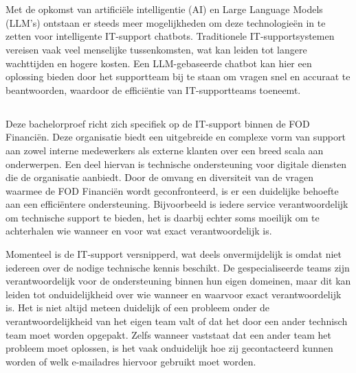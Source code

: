 
\chapter{}%
\label{ch:inleiding}

Met de opkomst van artificiële intelligentie (AI) en Large Language Models (LLM’s) ontstaan er steeds meer mogelijkheden om deze technologieën in te zetten voor intelligente IT-support chatbots. Traditionele IT-supportsystemen vereisen vaak veel menselijke tussenkomsten, wat kan leiden tot langere wachttijden en hogere kosten. Een LLM-gebaseerde chatbot kan hier een oplossing bieden door het supportteam bij te staan om vragen snel en accuraat te beantwoorden, waardoor de efficiëntie van IT-supportteams toeneemt.

\section{}%
\label{sec:probleemstelling}

Deze bachelorproef richt zich specifiek op de IT-support binnen de FOD Financiën. Deze organisatie biedt een uitgebreide en complexe vorm van support aan zowel interne medewerkers als externe klanten over een breed scala aan onderwerpen. Een deel hiervan is technische ondersteuning voor digitale diensten die de organisatie aanbiedt. Door de omvang en diversiteit van de vragen waarmee de FOD Financiën wordt geconfronteerd, is er een duidelijke behoefte aan een efficiëntere ondersteuning. Bijvoorbeeld is iedere service verantwoordelijk om technische support te bieden, het is daarbij echter soms moeilijk om te achterhalen wie wanneer en voor wat exact verantwoordelijk is. 

Momenteel is de IT-support versnipperd, wat deels onvermijdelijk is omdat niet iedereen over de nodige technische kennis beschikt. De gespecialiseerde teams zijn verantwoordelijk voor de ondersteuning binnen hun eigen domeinen, maar dit kan leiden tot onduidelijkheid over wie wanneer en waarvoor exact verantwoordelijk is. Het is niet altijd meteen duidelijk of een probleem onder de verantwoordelijkheid van het eigen team valt of dat het door een ander technisch team moet worden opgepakt. Zelfs wanneer vaststaat dat een ander team het probleem moet oplossen, is het vaak onduidelijk hoe zij gecontacteerd kunnen worden of welk e-mailadres hiervoor gebruikt moet worden.

